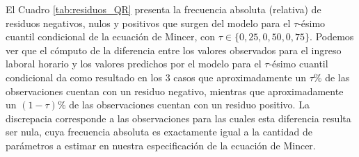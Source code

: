 \documentclass[11pt]{article}
\begin{document}
El Cuadro \ref{tab:residuos_QR} presenta la frecuencia absoluta (relativa) de residuos negativos, nulos y positivos que surgen del modelo para el $\tau$-ésimo cuantil condicional de la ecuación de Mincer, con $\tau\in\{0,25,0,50,0,75\}$. Podemos ver que el cómputo de la diferencia entre los valores observados para el ingreso laboral horario y los valores predichos por el modelo para el $\tau$-ésimo cuantil condicional da como resultado en los 3 casos que aproximadamente un $\tau\%$ de las observaciones cuentan con un residuo negativo, mientras que aproximadamente un $(1-\tau)\%$ de las observaciones cuentan con un residuo positivo. La discrepacia corresponde a las observaciones para las cuales esta diferencia resulta ser nula, cuya frecuencia absoluta es exactamente igual a la cantidad de parámetros a estimar en nuestra especificación de la ecuación de Mincer.
\end{document}
